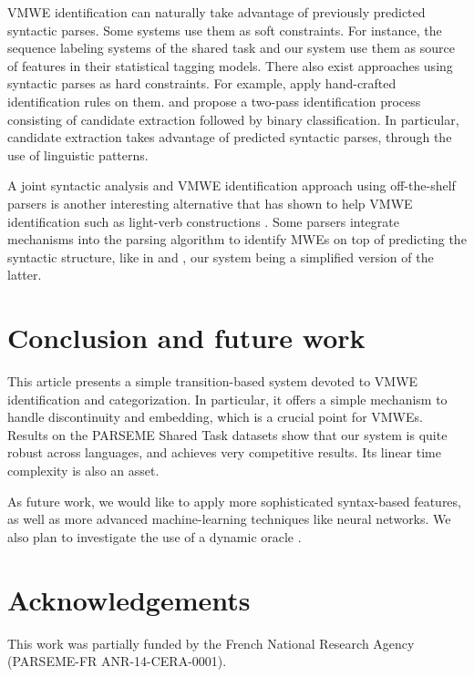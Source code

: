 \documentclass[output=paper,modfonts]{langscibook}
\begin{document}
VMWE identification can naturally take advantage of previously predicted syntactic parses. Some systems use them as soft constraints. For instance, the sequence labeling systems of the shared task and our system use them as source of features in their statistical tagging models. There also exist approaches using syntactic parses as hard constraints. For example, \citet{Baptista:2015} apply hand-crafted identification rules on them.  \citet{fazly-cook-stevenson:2009:CL} and \citet{nagyt-vincze:2014:MWE} propose a two-pass identification process consisting of candidate extraction followed by binary classification. In particular, candidate extraction takes advantage of predicted syntactic parses, through the use of linguistic patterns. 

A joint syntactic analysis and VMWE identification approach using off-the-shelf parsers is another interesting alternative that has shown to help VMWE identification such as light-verb constructions \citep{Eryigit:2011:MES:2206359.2206365,Vincze:2010}. Some parsers integrate mechanisms into the parsing algorithm to identify MWEs on top of predicting the syntactic structure, like in \citet{Wehrli:2010} and \citet{constant-nivre:acl:2016}, our system being a simplified version of the latter.
\section{Conclusion and future work}
This article presents a simple transition-based system devoted to VMWE identification and categorization. In particular, it offers a simple mechanism to handle discontinuity and embedding, which is a crucial point for VMWEs.
Results on the PARSEME Shared Task datasets show that our system is quite robust across languages, and achieves very competitive results. Its linear time complexity is also an asset.

As future work, we would like to apply more sophisticated syntax-based features, as well as more advanced machine-learning techniques like neural networks. We also plan to investigate the use of a dynamic oracle \citep{goldberg:2012}.
\section*{Acknowledgements}
This work was partially funded by the French National Research Agency (PARSEME-FR ANR-14-CERA-0001).
\end{document}
